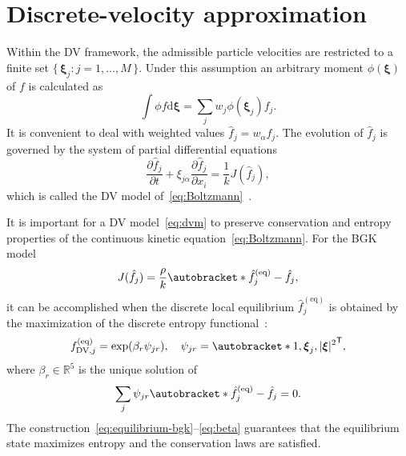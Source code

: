 \documentclass[]{elsarticle} %
\newcommand{\dd}{\mathrm{d}}
\newcommand{\pder}[2][]{\frac{\partial#1}{\partial#2}}
\newcommand{\Set}[2]{\{\,{#1}:{#2}\,\}}
\newcommand{\transpose}[1]{#1^\mathsf{T}}
\DeclarePairedDelimiter\autobracket()       %
\newcommand{\br}[1]{\autobracket*{#1}}
\newcommand{\dxi}{\dd{\boldsymbol{\xi}}}
\newcommand{\bxi}{\boldsymbol{\xi}}
\newcommand{\xiai}{\xi_{j \alpha}}
\newcommand{\equil}[1]{#1^\mathrm{(eq)}}
\newcommand{\DV}{\mathrm{DV}}
\begin{document}
\section{Discrete-velocity approximation}\label{sec:dv}

Within the DV framework, the admissible particle velocities are restricted to a finite set \(\Set{\bxi_j}{j=1,\dots,M}\).
Under this assumption an arbitrary moment \(\phi(\bxi)\) of \(f\) is calculated as
\begin{equation}\label{eq:cubature}
    \int \phi f\dxi = \sum_j w_j \phi(\bxi_j) f_j.
\end{equation}
It is convenient to deal with weighted values \(\hat{f}_j = w_\alpha f_j\).
The evolution of \(\hat{f}_j\) is governed by the system of partial differential equations
\begin{equation}\label{eq:dvm}
    \pder[\hat{f}_j]{t} + \xiai\pder[\hat{f}_j]{x_i} = \frac1kJ(\hat{f}_j),
\end{equation}
which is called the DV model of~\eqref{eq:Boltzmann}~\cite{Cabannes1980}.

It is important for a DV model~\eqref{eq:dvm} to preserve conservation and entropy properties
of the continuous kinetic equation~\eqref{eq:Boltzmann}.
For the BGK model
\begin{equation}\label{eq:dvm-bgk}
    J(\hat{f}_j) = \frac{\rho}{k} \br{\equil{\hat{f}}_j-\hat{f}_j},
\end{equation}
it can be accomplished when the discrete local equilibrium \(\equil{\hat{f}}_j\)
is obtained by the maximization of the discrete entropy functional~\cite{Mieussens2000}:
\begin{equation}\label{eq:equilibrium-bgk}
    \equil{f}_{\DV,j} = \exp(\beta_r\psi_{jr}), \quad \psi_{jr} = \transpose{\br{1,\bxi_j,|\bxi|^2}},
\end{equation}
where \(\beta_r\in\mathbb{R}^5\) is the unique solution of
\begin{equation}\label{eq:beta}
    \sum_j\psi_{jr}\br{\equil{\hat{f}}_j - \hat{f}_j} = 0.
\end{equation}
The construction~\eqref{eq:equilibrium-bgk}--\eqref{eq:beta} guarantees that
the equilibrium state maximizes entropy and the conservation laws are satisfied.

\end{document}
